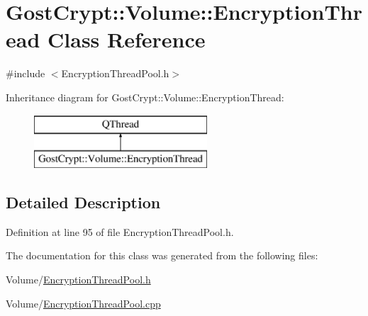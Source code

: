 \hypertarget{class_gost_crypt_1_1_volume_1_1_encryption_thread}{}\section{Gost\+Crypt\+:\+:Volume\+:\+:Encryption\+Thread Class Reference}
\label{class_gost_crypt_1_1_volume_1_1_encryption_thread}


{\ttfamily \#include $<$Encryption\+Thread\+Pool.\+h$>$}

Inheritance diagram for Gost\+Crypt\+:\+:Volume\+:\+:Encryption\+Thread\+:\begin{figure}[H]
\begin{center}
\leavevmode
\includegraphics[height=2.000000cm]{class_gost_crypt_1_1_volume_1_1_encryption_thread}
\end{center}
\end{figure}


\subsection{Detailed Description}


Definition at line 95 of file Encryption\+Thread\+Pool.\+h.



The documentation for this class was generated from the following files\+:\begin{DoxyCompactItemize}
\item 
Volume/\hyperlink{_encryption_thread_pool_8h}{Encryption\+Thread\+Pool.\+h}\item 
Volume/\hyperlink{_encryption_thread_pool_8cpp}{Encryption\+Thread\+Pool.\+cpp}\end{DoxyCompactItemize}
